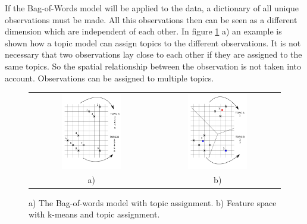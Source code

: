 If the Bag-of-Words model will be applied to the data, a dictionary of all unique observations must be made. All this observations then can be seen as a different dimension which are independent of each other. In figure \ref{fig:FSBOW} a) an example is shown how a topic model can assign topics to the different observations. It is not necessary that two observations lay close to each other if they are assigned to the same topics. So the spatial relationship between the observation is not taken into account. Observations can be assigned to multiple topics.\\
\begin{figure}
 \centering
 \begin{tabular}{c c}
  \includegraphics[width=0.5\textwidth]{Pictures/BOW.png} & \includegraphics[width=0.5\textwidth]{Pictures/kMeans.png}\\
  a) & b)
 \end{tabular}
 \caption{a) The Bag-of-words model with topic assignment. b) Feature space with k-means and topic assignment.} 
\label{fig:FSBOW}
\end{figure}

